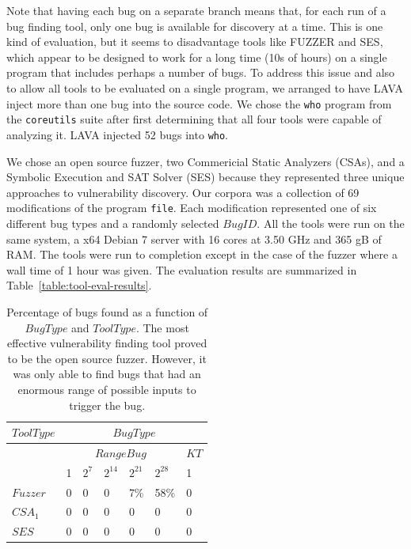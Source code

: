 Note that having each bug on a separate branch means that, for each run of a bug finding tool, only one bug is available for discovery at a time.  
This is one kind of evaluation, but it seems to disadvantage tools like FUZZER and SES, which appear to be designed to work for a long time (10s of hours) on a single program that includes perhaps a number of bugs. 
To address this issue and also to allow all tools to be evaluated on a single program, we arranged to have LAVA inject more than one bug into the source code.
We chose the \verb+who+ program from the \verb+coreutils+ suite after first determining that all four tools were capable of analyzing it.
LAVA injected 52 bugs into \verb+who+.  



We chose an open source fuzzer, two Commericial Static Analyzers (CSAs), and a Symbolic Execution and SAT Solver (SES) because they represented three unique approaches to vulnerability discovery.
Our corpora was a collection of 69 modifications of the program \verb+file+.
Each modification represented one of six different bug types and a randomly selected $Bug ID$.
All the tools were run on the same system, a x64 Debian 7 server with 16 cores at 3.50 GHz and 365 gB of \uppercase{ram}.
The tools were run to completion except in the case of the fuzzer where a wall time of 1 hour was given.
The evaluation results are summarized in Table~\ref{table:tool-eval-results}. 

\begin{table}[h]
\centering
\begin{tabular}{l|l|l|l|l|l|l} 
$Tool Type$ &                     \multicolumn{6}{|c}{$Bug Type$}                           \\  \hline  
            &                     \multicolumn{5}{|c|}{$Range Bug$}               & $KT$    \\   
            &    1       & $2^7$       & $2^{14}$     & $2^{21}$   & $2^{28}$     & 1   \\  \hline 
$Fuzzer$    &    0       & 0           & 0            & 7\%        & 58\%         & 0         \\
$CSA_1$       &    0       & 0           & 0            & 0          & 0            & 0         \\
$SES$       &    0       & 0           & 0            & 0          & 0            & 0         \\
\end{tabular}
\caption{Percentage of bugs found as a function of $Bug Type$ and $Tool Type$.  The most effective vulnerability finding tool proved to be the open source fuzzer.  However, it was only able to find bugs that had an enormous range of possible inputs to trigger the bug.}
\label{table:eval1-file}
\end{table}

